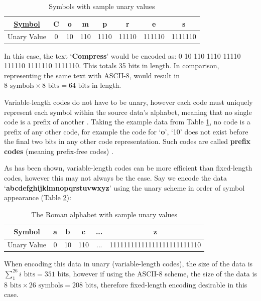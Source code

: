 \documentclass[12pt]{article}
\begin{document}
\begin{table}[H]
	\centering
	\begin{tabular}{|c|c|c|c|c|c|c|c|}
		\hline
		\underline{Symbol} & C & o & m & p & r & e & s \\
		\hline
		Unary Value & 0 & 10 & 110 & 1110 & 11110 & 111110 & 1111110 \\
		\hline
	\end{tabular}
	\caption{Symbols with sample unary values}
	\label{sym2unary}
\end{table}

In this case, the text `\textbf{Compress}' would be encoded as: 0 10 110 1110 11110 111110 1111110 1111110. This totals 35 bits in length. In comparison, representing the same text with ASCII-8, would result in $8\text{ symbols}\times8\text{ bits} = 64\text{ bits}$ in length.

Variable-length codes do not have to be unary, however each code must uniquely represent each symbol within the source data's alphabet, meaning that no single code is a prefix of another \citep[p.~30-32]{intro_to_dc}. Taking the example data from Table \ref{sym2unary}, no code is a prefix of any other code, for example the code for `\textbf{o}', `10' does not exist before the final two bits in any other code representation. Such codes are called \textbf{prefix codes} (meaning prefix-free codes) \citep[p.~26]{ipu_dc}.

As has been shown, variable-length codes can be more efficient than fixed-length codes, however this may not always be the case. Say we encode the data `\textbf{abcdefghijklmnopqrstuvwxyz}' using the unary scheme in order of symbol appearance (Table \ref{alphabet2unary}):

\begin{table}[H]
	\centering
	\begin{tabular}{|c|c|c|c|c|c|}
		\hline
		Symbol & a & b & c & ... & z \\
		\hline
		Unary Value & 0 & 10 & 110 & ... & 11111111111111111111111110 \\
		\hline
	\end{tabular}
	\caption{The Roman alphabet with sample unary values}
	\label{alphabet2unary}
\end{table}

When encoding this data in unary (variable-length codes), the size of the data is $\sum_{1}^{26}i\text{ bits}=351\text{ bits}$, however if using the ASCII-8 scheme, the size of the data is $8\text{ bits}\times26\text{ symbols}=208\text{ bits}$, therefore fixed-length encoding desirable in this case.
\end{document}
